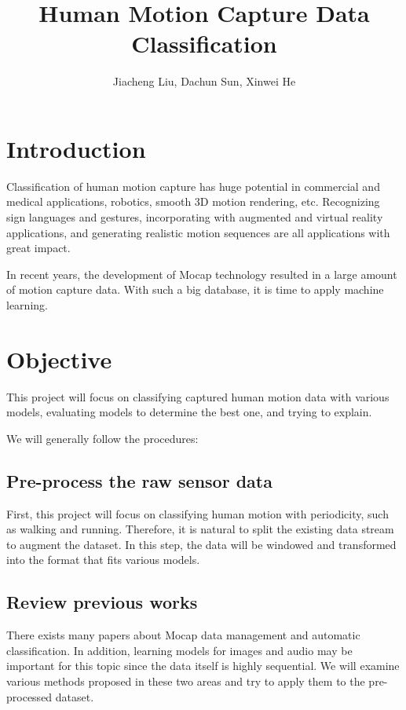 \documentclass[letterpaper, 10pt, conference]{ieeeconf}
\title{\LARGE \bf
Human Motion Capture Data Classification
}
\author{Jiacheng Liu, Dachun Sun, Xinwei He
}
\begin{document}
\maketitle
\thispagestyle{empty}
\pagestyle{empty}

\section{Introduction}

Classification of human motion capture has huge potential in commercial and medical applications, robotics, smooth 3D motion rendering, etc. Recognizing sign languages and gestures, incorporating with augmented and virtual reality applications, and generating realistic motion sequences are all applications with great impact. 

In recent years, the development of Mocap technology resulted in a large amount of motion capture data. With such a big database, it is time to apply machine learning. \\

\section{Objective}

This project will focus on classifying captured human motion data with various models, evaluating models to determine the best one, and trying to explain. 

We will generally follow the procedures: 

\subsection{Pre-process the raw sensor data}

First, this project will focus on classifying human motion with periodicity, such as walking and running. Therefore, it is natural to split the existing data stream to augment the dataset. In this step, the data will be windowed and transformed into the format that fits various models. 

\subsection{Review previous works}

There exists many papers about Mocap data management and automatic classification. In addition, learning models for images and audio may be important for this topic since the data itself is highly sequential. We will examine various methods proposed in these two areas and try to apply them to the pre-processed dataset. 
\end{document}
